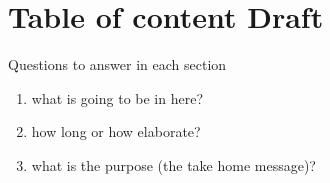 \chapter{Table of content Draft }

\graphicspath{{./Figures/Modeling}}

Questions to answer in each section 


\begin{enumerate}
	\item what is going to be in here?
	\item how long or how elaborate?
	\item what is the purpose (the take home message)? 
\end{enumerate}






